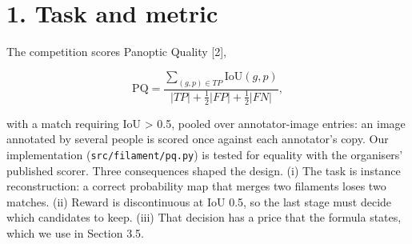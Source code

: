 
\begin{abstract}
We describe the system behind our two final submissions. Two independent lanes
propose filament instances on the full-disc GONG H-alpha frame: a YOLO11m-seg detector at 1792 px
and a twelve-member U-Net (EfficientNet-B3) semantic ensemble at 1536 px. Candidates are fused by
confidence-weighted voting, described by 42 features, and kept or dropped by a bagged two-stage
gradient-boosted selector whose keep threshold is derived from the Panoptic Quality formula and
not tuned. Out of fold on all 707 training images the system reaches PQ 0.443 (SQ 0.678,
RQ 0.653), where one annotator scored against the others reaches 0.340; the public leaderboard
displays 0.40. We report every parameter, the validation protocol, the Dice, IoU and relation
distributions, the morphology of the predictions including barbs, and the measured negative
results. The repository rebuilds both submitted files byte for byte.
\end{abstract}

\section{1. Task and metric}\label{task-and-metric}

The competition scores Panoptic Quality {[}2{]},

\[\mathrm{PQ}=\frac{\sum_{(g,p)\in TP}\mathrm{IoU}(g,p)}{|TP|+\tfrac12|FP|+\tfrac12|FN|},\]

with a match requiring IoU \textgreater{} 0.5, pooled over annotator-image entries: an image annotated by
several people is scored once against each annotator's copy. Our implementation
(\texttt{src/filament/pq.py}) is tested for equality with the organisers' published scorer. Three
consequences shaped the design. (i) The task is instance reconstruction: a correct probability map
that merges two filaments loses two matches. (ii) Reward is discontinuous at IoU 0.5, so the last
stage must decide which candidates to keep. (iii) That decision has a price that the formula
states, which we use in Section 3.5.

